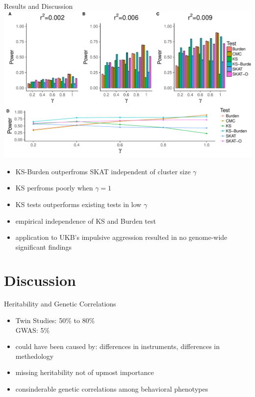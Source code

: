 \documentclass{beamer}
\begin{document}
\begin{frame}[t]{Results and Discussion}
  \tiny
  \includegraphics[width=0.8\linewidth]{../ksburden/figures/combined_power_analysis.pdf}
  \begin{itemize}
    \item KS-Burden outperfroms SKAT independent of cluster size $\gamma$
    \item KS perfroms poorly when $\gamma=1$
    \item KS tests outperforms existing tests in low $\gamma$
    \item empirical independence of KS and Burden test
    \item application to UKB's impulsive aggression resulted in no genome-wide significant findings
  \end{itemize}
\end{frame}

\section{Discussion}

\begin{frame}[t]{Heritability and Genetic Correlations}
  \begin{itemize}
    \item Twin Studies: 50\% to 80\% \\
      GWAS: 5\%
    \item could have been caused by: differences in instruments, differences in methedology
    \item missing heritability not of upmost importance
    \item consinderable genetic correlations among behavioral phenotypes
  \end{itemize}
\end{frame}
\end{document}
